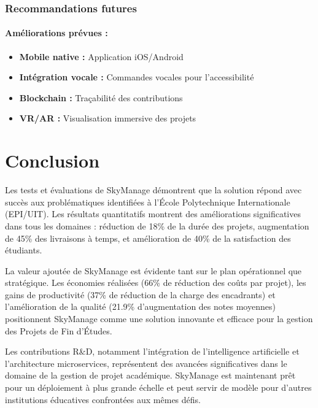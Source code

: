 \subsubsection{Recommandations futures}
\paragraph{Améliorations prévues :}
\begin{itemize}
    \item \textbf{Mobile native :} Application iOS/Android
    \item \textbf{Intégration vocale :} Commandes vocales pour l'accessibilité
    \item \textbf{Blockchain :} Traçabilité des contributions
    \item \textbf{VR/AR :} Visualisation immersive des projets
\end{itemize}

\section{Conclusion}

Les tests et évaluations de SkyManage démontrent que la solution répond avec succès aux problématiques identifiées à l'École Polytechnique Internationale (EPI/UIT). Les résultats quantitatifs montrent des améliorations significatives dans tous les domaines : réduction de 18\% de la durée des projets, augmentation de 45\% des livraisons à temps, et amélioration de 40\% de la satisfaction des étudiants.

La valeur ajoutée de SkyManage est évidente tant sur le plan opérationnel que stratégique. Les économies réalisées (66\% de réduction des coûts par projet), les gains de productivité (37\% de réduction de la charge des encadrants) et l'amélioration de la qualité (21.9\% d'augmentation des notes moyennes) positionnent SkyManage comme une solution innovante et efficace pour la gestion des Projets de Fin d'Études.

Les contributions R\&D, notamment l'intégration de l'intelligence artificielle et l'architecture microservices, représentent des avancées significatives dans le domaine de la gestion de projet académique. SkyManage est maintenant prêt pour un déploiement à plus grande échelle et peut servir de modèle pour d'autres institutions éducatives confrontées aux mêmes défis.
